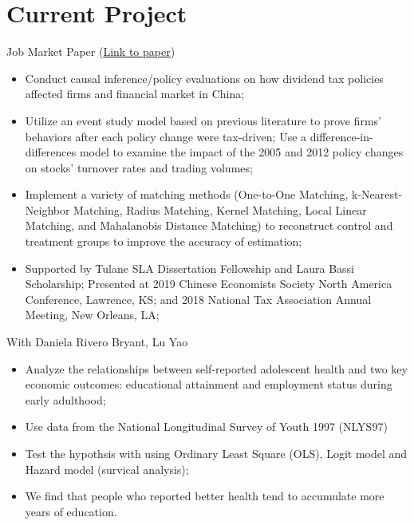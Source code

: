 \documentclass{resume}
\begin{document}
\section{Current Project}
Job Market Paper (\href{https://liberalarts.tulane.edu/sites/liberalarts.tulane.edu/files/sites/default/files/Xie%20JMP_0.pdf}{Link to paper})
\begin{itemize}
  \item Conduct causal inference/policy evaluations on how dividend tax policies affected firms and financial market in China;
  \item Utilize an event study model based on previous literature to prove firms’ behaviors after each policy change were tax-driven; Use a difference-in-differences model to examine the impact of the 2005 and 2012 policy changes on stocks’ turnover rates and trading volumes;
  \item Implement a variety of matching methods (One-to-One Matching, k-Nearest-Neighbor Matching, Radius Matching, Kernel Matching, Local Linear Matching, and Mahalanobis Distance Matching) to reconstruct control and treatment groups to improve the accuracy of estimation;
  \item Supported by Tulane SLA Dissertation Fellowship and Laura Bassi Scholarship; Presented at 2019 Chinese Economists Society North America Conference, Lawrence, KS; and 2018 National Tax Association Annual Meeting, New Orleans, LA; 
\end{itemize}

With Daniela Rivero Bryant, Lu Yao
\begin{itemize}
  \item Analyze the relationships between self-reported adolescent health and two key economic outcomes: educational attainment and employment status during early adulthood;
  \item Use data from the National Longitudinal Survey of Youth 1997 (NLYS97)
  \item Test the hypothsis with using Ordinary Least Square (OLS), Logit model and Hazard model (survical analysis);
  \item We find that people who reported better health tend to accumulate more years of education.
\end{itemize}
\end{document}
